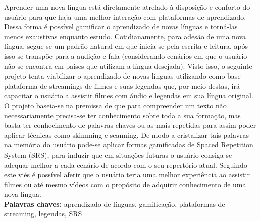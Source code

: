 \documentclass[12pt]{article}
\begin{document}
\begin{resumo} 
 Aprender uma nova língua está diretamente atrelado à disposição e conforto do usuário para que haja uma melhor interação com plataformas de aprendizado. Dessa forma é possível gamificar o aprendizado de novas línguas e torná-las menos exaustivas enquanto estudo. Cotidianamente, para adesão de uma nova língua, segue-se um padrão natural em que inicia-se pela escrita e leitura, após isso se transpõe para a audição e fala (considerando cenários em que o usuário não se encontra em países que utilizam a língua desejada). Visto isso, o seguinte projeto tenta viabilizar o aprendizado de novas línguas utilizando como base plataforma de streamings de filmes e suas legendas que, por meio destas, irá capacitar o usuário a assistir filmes com áudio e legendas em sua língua original.
O projeto baseia-se na premissa de que para compreender um texto não necessariamente precisa-se ter conhecimento sobre toda a sua formação, mas basta ter conhecimento de palavras chaves ou as mais repetidas para assim poder aplicar técnicas como skimming e scanning. De modo a cristalizar tais palavras na memória do usuário pode-se aplicar formas gamificadas de
Spaced Repetition System (SRS), para induzir que em situações futuras o usuário
consiga se adequar melhor a cada cenário de acordo com o seu repertório atual. Seguindo este viés é possível aferir que o usuário teria uma melhor experiência ao assistir filmes ou até
mesmo vídeos com o propósito de adquirir conhecimento de uma nova língua.
\\
\textbf{Palavras chaves:} aprendizado de línguas, gamificação, plataformas de streaming, legendas, SRS
\end{resumo}
\end{document}
